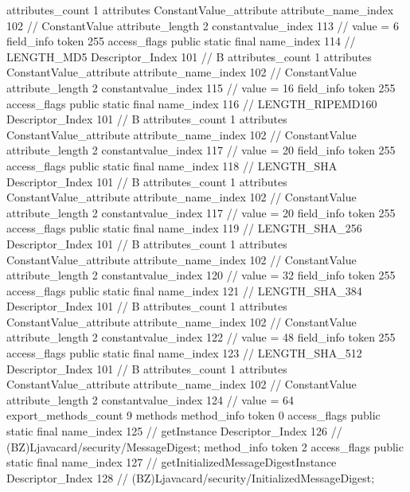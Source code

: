 {{{{{				attributes_count	1
				attributes {
				ConstantValue_attribute {
					attribute_name_index	102		// ConstantValue
					attribute_length	2
					constantvalue_index	113		// value = 6
				}
				}
			}
			field_info {
				token	255
				access_flags	public static final
				name_index	114		// LENGTH_MD5
				Descriptor_Index	101		// B
				attributes_count	1
				attributes {
				ConstantValue_attribute {
					attribute_name_index	102		// ConstantValue
					attribute_length	2
					constantvalue_index	115		// value = 16
				}
				}
			}
			field_info {
				token	255
				access_flags	public static final
				name_index	116		// LENGTH_RIPEMD160
				Descriptor_Index	101		// B
				attributes_count	1
				attributes {
				ConstantValue_attribute {
					attribute_name_index	102		// ConstantValue
					attribute_length	2
					constantvalue_index	117		// value = 20
				}
				}
			}
			field_info {
				token	255
				access_flags	public static final
				name_index	118		// LENGTH_SHA
				Descriptor_Index	101		// B
				attributes_count	1
				attributes {
				ConstantValue_attribute {
					attribute_name_index	102		// ConstantValue
					attribute_length	2
					constantvalue_index	117		// value = 20
				}
				}
			}
			field_info {
				token	255
				access_flags	public static final
				name_index	119		// LENGTH_SHA_256
				Descriptor_Index	101		// B
				attributes_count	1
				attributes {
				ConstantValue_attribute {
					attribute_name_index	102		// ConstantValue
					attribute_length	2
					constantvalue_index	120		// value = 32
				}
				}
			}
			field_info {
				token	255
				access_flags	public static final
				name_index	121		// LENGTH_SHA_384
				Descriptor_Index	101		// B
				attributes_count	1
				attributes {
				ConstantValue_attribute {
					attribute_name_index	102		// ConstantValue
					attribute_length	2
					constantvalue_index	122		// value = 48
				}
				}
			}
			field_info {
				token	255
				access_flags	public static final
				name_index	123		// LENGTH_SHA_512
				Descriptor_Index	101		// B
				attributes_count	1
				attributes {
				ConstantValue_attribute {
					attribute_name_index	102		// ConstantValue
					attribute_length	2
					constantvalue_index	124		// value = 64
				}
				}
			}
			}
			export_methods_count	9
			methods {
				method_info {
					token	0
					access_flags	public static final
					name_index	125		// getInstance
					Descriptor_Index	126		// (BZ)Ljavacard/security/MessageDigest;
				}
				method_info {
					token	2
					access_flags	public static final
					name_index	127		// getInitializedMessageDigestInstance
					Descriptor_Index	128		// (BZ)Ljavacard/security/InitializedMessageDigest;
}}}}}
